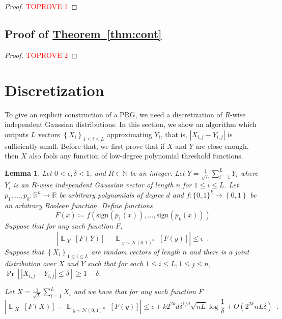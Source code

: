 \documentclass[12pt]{article}
\newtheorem{lemma}[theorem]{Lemma}
\newcommand{\thm}[1]{\hyperref[thm:#1]{Theorem~\ref*{thm:#1}}}
\newcommand{\N}{\mathbb{N}}  \newcommand{\R}{\mathbb{R}} \newcommand{\C}{\mathbb{C}} \newcommand{\U}{\mathbb{U}} \renewcommand{\d}{\mathrm{d}} \DeclareMathOperator*{\E}{\mathbb{E}}  \newcommand{\so}{\mathrm{SO}} \newcommand{\s}{\mathrm{S}} \newcommand{\su}{\mathrm{SU}} \renewcommand{\i}{\mathrm{i}} \newcommand{\A}{\mathcal{A}}  \newcommand{\B}{\mathcal{B}} \newcommand{\CC}{\mathcal{C}} \newcommand{\D}{\mathcal{D}} \newcommand{\F}{\mathcal{F}} \renewcommand{\H}{\mathcal{H}} \newcommand{\K}{\mathcal{K}} \newcommand{\NN}{\mathcal{N}} \newcommand{\V}{\mathcal{V}} \newcommand{\X}{\mathcal{X}} \newcommand{\Y}{\mathcal{Y}} \renewcommand{\S}{\mathcal{S}} \newcommand{\SR}{\mathcal{S}_{\R}} \newcommand{\SC}{\mathcal{S}_{\C}} \newcommand{\EE}{\mathcal{E}}  \newcommand{\PP}{\mathcal{P}} \newcommand{\KK}{\widetilde{K}} \newcommand{\LL}{\widetilde{L}} \newcommand{\W}{\widehat{W}} \newcommand{\f}{\hat{f}} \newcommand{\g}{\hat{g}} \newcommand{\h}{\hat{h}} \newcommand{\bit}[1]{\{0,1\}^{#1}} \newcommand{\wrt}{w.r.t.~} \newcommand{\us}{\overset{\$}{\leftarrow}} \newcommand{\set}[1]{\left\{#1\right\}} \newcommand{\lhs}{\mathrm{LHS}} \newcommand{\expec}[1]{\E\!\Br{#1}} \newcommand{\expect}[2]{\E_{\substack{#1}}\!\Br{#2}} \newcommand{\prob}[2]{\underset{#1}{\mathrm{Pr}}\!\Br{#2}} \newcommand{\cf}{\widetilde{f}} \newcommand{\cg}{\widetilde{g}} \newcommand{\ch}{\widetilde{h}} \newcommand{\ck}{\widetilde{K}} \newcommand{\rep}[2]{\br{#1}_{#2}} \newcommand{\AND}[1]{\mathrm{AND}\!\br{#1}}
\newcommand{\sign}[1]{\mathrm{sign}\!\br{#1}}
\newcommand{\br}[1]{\left(#1\right)} \newcommand{\Br}[1]{\left[#1\right]} \newcommand{\st}[1]{\left\{#1\right\}} \newcommand{\tr}[1]{\mathrm{Tr}\!\Br{#1}} \newcommand{\abs}[1]{\left|#1 \right|} \newcommand{\norm}[1]{\left\lVert #1 \right\rVert} \newcommand{\agl}[2]{\theta^{\br{#1}}_{#2}} \newcommand{\aglp}[2]{{\theta'}^{\br{#1}}_{#2}} \newcommand{\lint}[1]{\left\lfloor#1\right\rfloor} \newcommand{\poly}[1]{\mathrm{poly}\!\br{#1}} \newcommand{\negl}[1]{\mathrm{negl}\!\br{#1}} \newcommand{\de}[1]{\mathrm{d}#1} \newcommand{\val}[1]{\mathrm{val}\!\br{#1}} \newcommand{\vall}[1]{\mathrm{val}\br{#1}} \newcommand{\nd}[1]{\mathcal{N}\!\br{#1}} \newcommand{\ketbratwo}[2]{\ket{#1} \hspace{-0.4em}\bra{#2}} \newcommand{\ketbra}[1]{\ketbratwo{#1}{#1}} \newcommand{\id}{\ensuremath{\mathds{1}}} \newcommand{\ogroup}[1]{\mathrm{O}\!\br{#1}} \newcommand{\ugroup}[1]{\mathrm{U}\!\br{#1}} \newcommand{\td}{\mathrm{TD}} \newcommand{\tv}[1]{\norm{#1}_{\mathrm{TV}}} \newcommand {\defeq} {\ensuremath{ \stackrel{\mathrm{def}}{=} }} \newcommand{\vdim}{\ensuremath{N}} \newcommand{\dimin}{\ensuremath{n}} \newcommand{\dimout}{\ensuremath{m}} \newcommand{\ncopy}{\ell} \newcommand{\hspacein}{\H_\mathrm{in}} \newcommand{\hspaceout}{\H_\mathrm{out}} \newcommand{\Sin}{\S(\hspacein)} \newcommand{\Sout}{\S(\hspaceout)} \newcommand{\haar}{\ensuremath{\mu}} \newcommand{\tensorhaar}{\ensuremath{\eta}} \newcommand{\tensorsrss}{\ensuremath{\nu}} \newcommand{\qadvice}{\ensuremath{\rho}} \newcommand{\tp}{\otimes} \newcommand{\wone}[2]{W_1\!\br{#1,#2}}
\begin{document}
\begin{proof}\textcolor{red}{TOPROVE 1}\end{proof}




\subsection{Proof of \thm{cont}} \label{sec:main}	
\begin{proof}\textcolor{red}{TOPROVE 2}\end{proof}
	
	
	
	
	
	
	
	
	
	
	
	 

\section{Discretization}
\label{sec:discrete}
To give an explicit construction of a PRG,
we need a discretization of $R$-wise independent Gaussian distributions. 
In this section, we show an algorithm which outputs $L$ vectors $\st{X_i}_{1\leq i\leq L}$ approximating $Y_i$, that is, $\abs{X_{i,j}-Y_{i,j}}$ is sufficiently small. Before that, we first prove that if $X$ and $Y$ are close enough, then $X$ also fools any function of low-degree polynomial threshold functions.



\begin{lemma}\label{lem:discrete}
	Let $0<\epsilon,\delta<1$, and $R\in\N$ be an integer.
	Let $Y = \frac{1}{\sqrt{L}}\sum_{i=1}^L Y_i$ where $Y_i$ is an $R$-wise independent Gaussian vector of length $n$ for $1\leq i\leq L$.
	Let $p_1,\dots,p_k:\R^n \to \R$ be arbitrary polynomials of degree $d$ and $f:\bit{k}\to\st{0,1}$ be an arbitrary Boolean function.
	Define functions
	\[
		F(x)\coloneqq f\!\br{\sign{p_1\!(x)},\dots,\sign{p_k\!(x)}}
	\]
Suppose that for any such function $F$,
	\[
	\abs{
		\expect{Y}{
			F(Y)	
		}
		-
		\expect{y\sim\NN\br{0,1}^n}{
			F(y)
		}
	} \leq \epsilon \enspace .
	\]
	Suppose that $\st{X_{i}}_{1\leq i\leq L}$ are random vectors of length $n$ and there is a joint distribution over $X$ and $Y$ such that
	for each $1\leq i\leq L,1\leq j\leq n$, 
	$\Pr\Br{\abs{X_{i,j}-Y_{i,j}}\leq \delta}\geq 1-\delta$.
	
	Let $X = \frac{1}{\sqrt{L}}\sum_{i=1}^L X_i$ and we have that for any such function $F$
	\[
	\abs{
		\expect{X}{
			F(X)	
		}
		-
		\expect{y\sim\NN\br{0,1}^n}{
			F(y)
		}
	} \leq \epsilon + k 2^{2k}d \delta^{1/d} \sqrt{nL} \log\frac{1}{\delta}  + O(2^{2k}nL\delta) \enspace .
	\]
\end{lemma}
\end{document}
